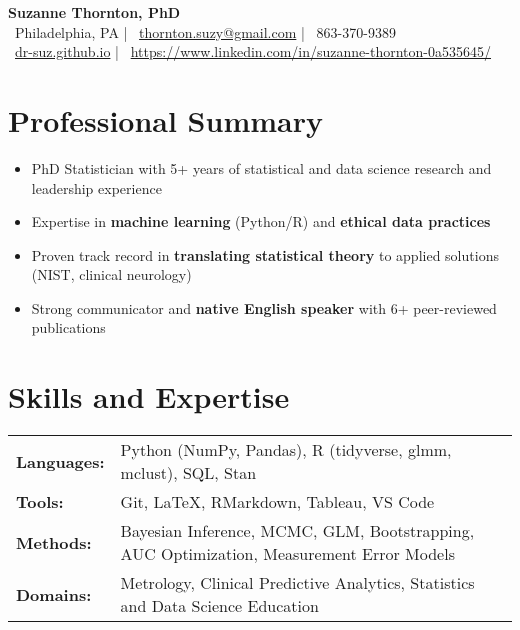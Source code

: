 \documentclass[10pt]{article}
\begin{document}
\begin{center}
    {\Huge\bfseries Suzanne Thornton, PhD} \\[5pt]
    {\large\color{secondary}
    \faMapMarker\ Philadelphia, PA \hspace{0.5em} | \hspace{0.5em}
    \faEnvelope\ \href{mailto:thornton.suzy@gmail.com}{thornton.suzy@gmail.com} \hspace{0.5em} | \hspace{0.5em}
    \faPhone\ 863-370-9389 \\[5pt]
    \faGithub\ \href{https://dr-suz.github.io}{dr-suz.github.io} \hspace{0.5em} | \hspace{0.5em}
    \faLinkedin\ \href{https://www.linkedin.com/in/suzanne-thornton-0a535645/}{https://www.linkedin.com/in/suzanne-thornton-0a535645/} 
    }
\end{center}

\section*{Professional Summary} %
\begin{itemize}[leftmargin=*,nosep]
    \item PhD Statistician with 5+ years of statistical and data science research and leadership experience
    \item Expertise in \textbf{machine learning} (Python/R) and \textbf{ethical data practices}
    \item Proven track record in \textbf{translating statistical theory} to applied solutions (NIST, clinical neurology)
    \item Strong communicator and \textbf{native English speaker} with 6+ peer-reviewed publications %
\end{itemize}

\section*{Skills and Expertise}
\begin{tabular}{@{}ll@{}}
    \textbf{Languages:} & Python (NumPy, Pandas), R (tidyverse, glmm, mclust), SQL, Stan \\
    \textbf{Tools:} & Git, LaTeX, RMarkdown, Tableau, VS Code \\
    \textbf{Methods:} & Bayesian Inference, MCMC, GLM, Bootstrapping, AUC Optimization, Measurement Error Models \\
    \textbf{Domains:} & Metrology, Clinical Predictive Analytics, Statistics and Data Science Education  
\end{tabular}
\end{document}
